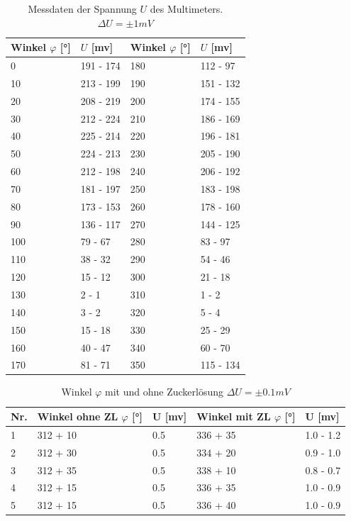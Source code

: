 \documentclass[12pt,a4paper,twoside]{article}
\begin{document}
\begin{table}[H]
    \centering
    \caption{Messdaten der Spannung $U$ des Multimeters. $\Delta U = \pm 1mV$}
    \label{tab:Messdaten Mallus}
    \begin{tabular}{| l | l | l | l |}
        \hline
        Winkel $\varphi$ [°] & $U$ [mv] & Winkel $\varphi$ [°] & $U$ [mv] \\
        \hline
        0    & 191 - 174  & 180   & 112 - 97   \\
        10   & 213 - 199  & 190   & 151 - 132  \\
        20   & 208 - 219  & 200   & 174 - 155  \\
        30   & 212 - 224  & 210   & 186 - 169  \\
        40   & 225 - 214  & 220   & 196 - 181  \\
        50   & 224 - 213  & 230   & 205 - 190  \\
        60   & 212 - 198  & 240   & 206 - 192  \\
        70   & 181 - 197  & 250   & 183 - 198  \\
        80   & 173 - 153  & 260   & 178 - 160  \\
        90   & 136 - 117  & 270   & 144 - 125  \\
        100  & 79 - 67    & 280   & 83 - 97    \\
        110  & 38 - 32    & 290   & 54 - 46    \\
        120  & 15 - 12    & 300   & 21 - 18    \\
        130  & 2 - 1      & 310   & 1 - 2      \\
        140  & 3 - 2      & 320   & 5 - 4      \\
        150  & 15 - 18    & 330   & 25 - 29    \\
        160  & 40 - 47    & 340   & 60 - 70    \\
        170  & 81 - 71    & 350   & 115 - 134  \\
        \hline
    \end{tabular}
\end{table}

\begin{table}[H]
    \centering
    \caption{Winkel $\varphi$ mit und ohne Zuckerlösung $\Delta U = \pm 0.1mV$}
    \label{tab:Messdaten Zuckerlösung}
    \begin{tabular}{| l | l | l | l | l |}
        \hline
        Nr. & Winkel ohne ZL $\varphi$ [°] & U [mv] & Winkel mit ZL $\varphi$ [°] & U [mv] \\
        \hline
        1   & 312 + 10  & 0.5   & 336 + 35 & 1.0 - 1.2 \\
        2   & 312 + 30  & 0.5   & 334 + 20 & 0.9 - 1.0 \\
        3   & 312 + 35  & 0.5   & 338 + 10 & 0.8 - 0.7 \\
        4   & 312 + 15  & 0.5   & 336 + 35 & 1.0 - 0.9 \\
        5   & 312 + 15  & 0.5   & 336 + 40 & 1.0 - 0.9 \\
        \hline
    \end{tabular}
\end{table}
\end{document}
